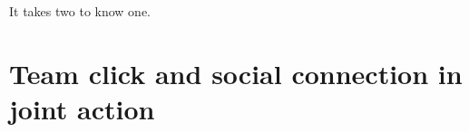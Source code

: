 \begin{savequote}[8cm]

  It takes two to know one.


\end{savequote}




\chapter{\label{chap:theory}Team click and social connection in joint action}

\minitoc


